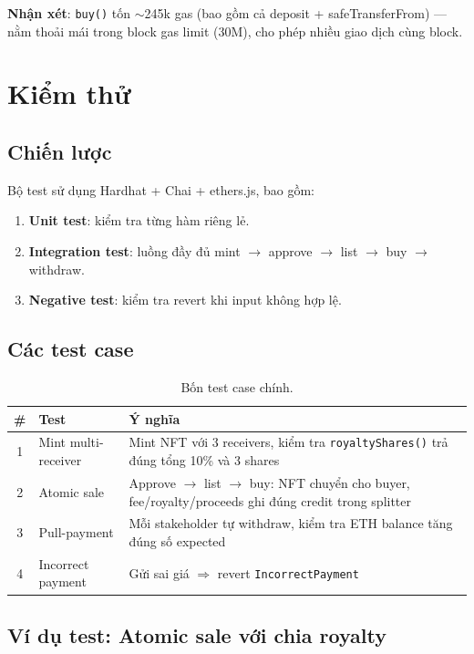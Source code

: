 \documentclass[12pt,a4paper,oneside]{report}
\theoremstyle{plain}
\theoremstyle{definition}
\theoremstyle{remark}
\begin{document}
\textbf{Nhận xét}: \texttt{buy()} tốn $\sim$245k gas (bao gồm cả deposit + safeTransferFrom) — nằm
thoải mái trong block gas limit (30M), cho phép nhiều giao dịch cùng block.

\chapter{Kiểm thử}
\label{chap:testing}

\section{Chiến lược}

Bộ test sử dụng Hardhat + Chai + ethers.js, bao gồm:
\begin{enumerate}
  \item \textbf{Unit test}: kiểm tra từng hàm riêng lẻ.
  \item \textbf{Integration test}: luồng đầy đủ mint $\to$ approve $\to$ list $\to$ buy $\to$ withdraw.
  \item \textbf{Negative test}: kiểm tra revert khi input không hợp lệ.
\end{enumerate}

\section{Các test case}

\begin{table}[H]
\centering\small
\begin{tabularx}{\textwidth}{c p{3cm} X}
\toprule
\textbf{\#} & \textbf{Test} & \textbf{Ý nghĩa} \\
\midrule
1 & Mint multi-receiver & Mint NFT với 3 receivers, kiểm tra \texttt{royaltyShares()} trả đúng tổng 10\% và 3 shares \\
2 & Atomic sale & Approve $\to$ list $\to$ buy: NFT chuyển cho buyer, fee/royalty/proceeds ghi đúng credit trong splitter \\
3 & Pull-payment & Mỗi stakeholder tự withdraw, kiểm tra ETH balance tăng đúng số expected \\
4 & Incorrect payment & Gửi sai giá $\Rightarrow$ revert \texttt{IncorrectPayment} \\
\bottomrule
\end{tabularx}
\caption{Bốn test case chính.}
\end{table}

\section{Ví dụ test: Atomic sale với chia royalty}
\end{document}
